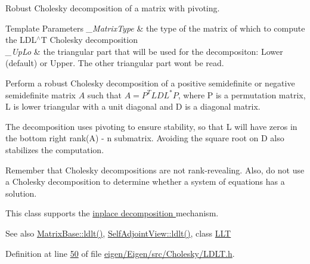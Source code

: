 Robust Cholesky decomposition of a matrix with pivoting. 


\begin{DoxyTemplParams}{Template Parameters}
{\em \+\_\+\+Matrix\+Type} & the type of the matrix of which to compute the L\+D\+L$^\wedge$T Cholesky decomposition \\
\hline
{\em \+\_\+\+Up\+Lo} & the triangular part that will be used for the decompositon\+: Lower (default) or Upper. The other triangular part won\textquotesingle{}t be read.\\
\hline
\end{DoxyTemplParams}
Perform a robust Cholesky decomposition of a positive semidefinite or negative semidefinite matrix $ A $ such that $ A = P^TLDL^*P $, where P is a permutation matrix, L is lower triangular with a unit diagonal and D is a diagonal matrix.

The decomposition uses pivoting to ensure stability, so that L will have zeros in the bottom right rank(\+A) -\/ n submatrix. Avoiding the square root on D also stabilizes the computation.

Remember that Cholesky decompositions are not rank-\/revealing. Also, do not use a Cholesky decomposition to determine whether a system of equations has a solution.

This class supports the \hyperlink{group___inplace_decomposition}{inplace decomposition } mechanism.

\begin{DoxySeeAlso}{See also}
\hyperlink{group___core___module_a0ecf058a0727a4cab8b42d79e95072e1}{Matrix\+Base\+::ldlt()}, \hyperlink{group___core___module_a644155eef17b37c95d85b9f65bb49ac4}{Self\+Adjoint\+View\+::ldlt()}, class \hyperlink{group___cholesky___module_class_eigen_1_1_l_l_t}{L\+LT} 
\end{DoxySeeAlso}


Definition at line \hyperlink{eigen_2_eigen_2src_2_cholesky_2_l_d_l_t_8h_source_l00050}{50} of file \hyperlink{eigen_2_eigen_2src_2_cholesky_2_l_d_l_t_8h_source}{eigen/\+Eigen/src/\+Cholesky/\+L\+D\+L\+T.\+h}.

